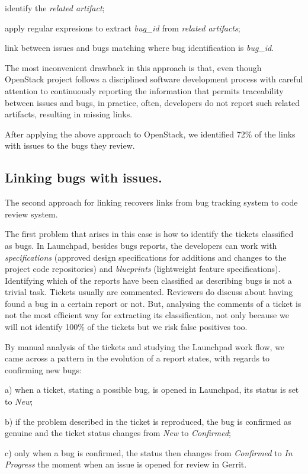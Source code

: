 \documentclass{sig-alternate-05-2015}
\begin{document}
\begin{list}{}{}

\item[$\space$] identify the \emph{related artifact};

apply regular expresions to extract \emph{bug\_id} from \emph{related artifacts};

link between issues and bugs matching where bug identification is \emph{bug\_id}.

\end{list}

The most inconvenient drawback in this approach is that, even though OpenStack project follows a disciplined 
software development process with careful attention to continuously reporting the information that permits 
traceability between issues and bugs, in practice, often, developers do not report such related artifacts, 
resulting in missing links.

After applying the above approach to OpenStack, we identified 72\% of the links with issues to the bugs they 
review.

\subsection{Linking bugs with issues.}
The second approach for linking recovers links from bug tracking system to code review system.

The first problem that arises in this case is how to identify the tickets classified as bugs. 
In Launchpad, besides bugs reports, the developers can work with \textit{specifications} 
(approved design specifications for additions and changes to the project code repositories) 
and \textit{blueprints} (lightweight feature specifications).
Identifying which of the reports have been classified as describing bugs is not a trivial task.
Tickets usually are commented. Reviewers do discuss about having found a bug in a certain report or not. 
But, analysing the comments of a ticket is not the most efficient way for extracting its classification, 
not only because we will not identify 100\% of the tickets but we risk false positives too.

By manual analysis of the tickets and studying the Launchpad work flow, we came across a pattern 
in the evolution of a report states, with regards to confirming new bugs:

\begin{list}{}{}

\item[$\space$] a) when a ticket, stating a possible bug, is opened in Launchpad, its status is set to 
\textit{New};
\item[$\space$] b) if the problem described in the ticket is reproduced, the bug is confirmed as genuine and the 
ticket status changes from \textit{New} to \textit{Confirmed};
\item[$\space$] c) only when a bug is confirmed, the status then changes from \textit{Confirmed} to \textit{In Progress} 
the moment when an issue is opened for review in Gerrit.
  
\end{list}
\end{document}
